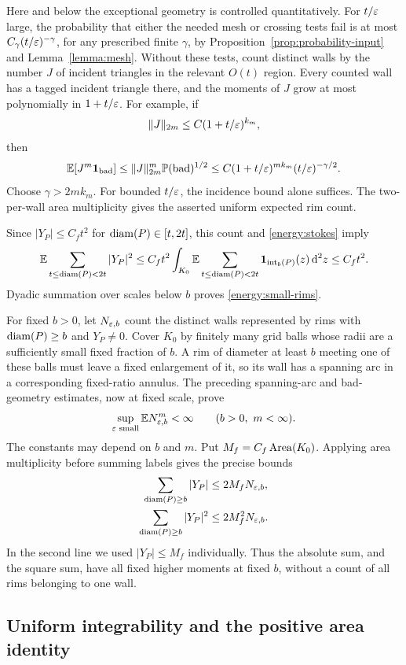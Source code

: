 Here and below the exceptional geometry is controlled quantitatively.
For $t/\varepsilon$ large, the probability that either the needed mesh or crossing
tests fail is at most $C_\gamma(t/\varepsilon)^{-\gamma}$, for any prescribed
finite $\gamma$, by Proposition~\ref{prop:probability-input} and
Lemma~\ref{lemma:mesh}. Without these tests, count distinct walls by the
number $J$ of incident triangles in the relevant $O(t)$ region. Every
counted wall has a tagged incident triangle there, and the moments of $J$
grow at most polynomially in $1+t/\varepsilon$. For example, if
\[
 \|J\|_{2m}\le C(1+t/\varepsilon)^{k_m},
\]
then
\[
 \mathbb E[J^m\mathbf 1_{\mathrm{bad}}]
 \le \|J\|_{2m}^{m}\mathbb P(\mathrm{bad})^{1/2}
 \le C(1+t/\varepsilon)^{mk_m}(t/\varepsilon)^{-\gamma/2}.
\]
Choose $\gamma>2mk_m$. For bounded $t/\varepsilon$, the incidence bound alone
suffices. The two-per-wall area multiplicity gives the asserted uniform
expected rim count.

Since $|Y_P|\le C_ft^2$ for $\operatorname{diam}(P)\in[t,2t]$, this count and
\eqref{energy:stokes} imply
\[
 \mathbb E\sum_{t\le\operatorname{diam}(P)<2t}|Y_P|^2
 \le C_ft^2\int_{K_0}
       \mathbb E\sum_{t\le\operatorname{diam}(P)<2t}
            \mathbf 1_{\operatorname{int}_b(P)}(z)\,\mathrm d^2z
 \le C_f t^2.
\]
Dyadic summation over scales below $b$ proves
\eqref{energy:small-rims}.

For fixed $b>0$, let $N_{\varepsilon,b}$ count the distinct walls represented by
rims with $\operatorname{diam}(P)\ge b$ and $Y_P\ne0$. Cover $K_0$ by finitely many grid
balls whose radii are a sufficiently small fixed fraction of $b$. A rim
of diameter at least $b$ meeting one of these balls must leave a fixed
enlargement of it, so its wall has a spanning arc in a corresponding
fixed-ratio annulus. The preceding spanning-arc and bad-geometry estimates,
now at fixed scale, prove
\[
          \sup_{\varepsilon\text{ small}}\mathbb E N_{\varepsilon,b}^{m}<\infty
          \qquad (b>0,\ m<\infty).
\]
The constants may depend on $b$ and $m$. Put $M_f=C_f\operatorname{Area}(K_0)$.
Applying area multiplicity before summing labels gives the precise bounds
\begin{align}
 \sum_{\operatorname{diam}(P)\ge b}|Y_P|&\le 2M_fN_{\varepsilon,b},\notag\\
 \sum_{\operatorname{diam}(P)\ge b}|Y_P|^2&\le 2M_f^2N_{\varepsilon,b}.
 \label{energy:macro-multiplicity}
\end{align}
In the second line we used $|Y_P|\le M_f$ individually. Thus the absolute
sum, and the square sum, have all fixed higher moments at fixed $b$,
without a count of all rims belonging to one wall.

\subsection{Uniform integrability and the positive area identity}


